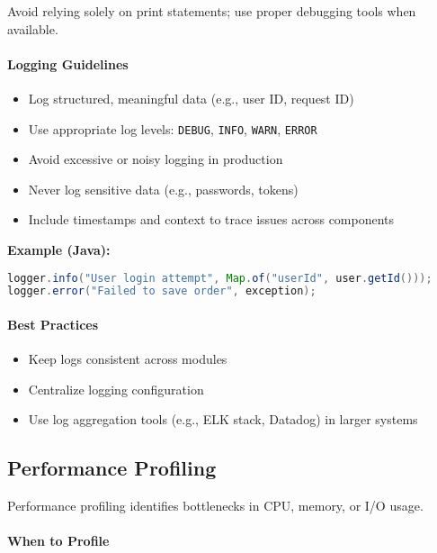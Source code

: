 \documentclass[a4paper,12pt]{article}
\begin{document}
Avoid relying solely on print statements; use proper debugging tools when available.

\paragraph{Logging Guidelines}

\begin{itemize}
  \item Log structured, meaningful data (e.g., user ID, request ID)
  \item Use appropriate log levels: \texttt{DEBUG}, \texttt{INFO}, \texttt{WARN}, \texttt{ERROR}
  \item Avoid excessive or noisy logging in production
  \item Never log sensitive data (e.g., passwords, tokens)
  \item Include timestamps and context to trace issues across components
\end{itemize}

\textbf{Example (Java):}
\begin{lstlisting}[language=Java]
logger.info("User login attempt", Map.of("userId", user.getId()));
logger.error("Failed to save order", exception);
\end{lstlisting}

\paragraph{Best Practices}

\begin{itemize}
  \item Keep logs consistent across modules
  \item Centralize logging configuration
  \item Use log aggregation tools (e.g., ELK stack, Datadog) in larger systems
\end{itemize}

\subsection{Performance Profiling}

Performance profiling identifies bottlenecks in CPU, memory, or I/O usage.

\paragraph{When to Profile}
\end{document}
